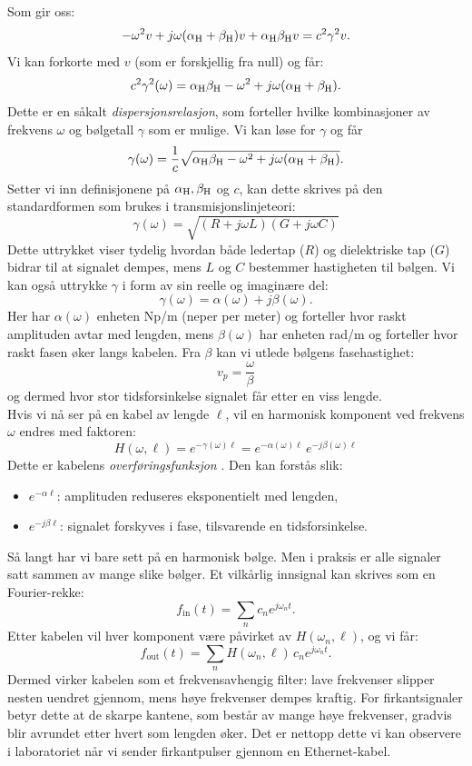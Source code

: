 Som gir oss:
\[    
-\omega^2 v + j\omega(\alpha_{\mathrm{H}}+\beta_{\mathrm{H}})v + \alpha_{\mathrm{H}} \beta_{\mathrm{H}} v = c^2 \gamma^2 v.
\]
Vi kan forkorte med $v$ (som er forskjellig fra null) og får:
\[
c^2 \gamma^2(\omega) = \alpha_{\mathrm{H}} \beta_{\mathrm{H}} - \omega^2 + j\omega(\alpha_{\mathrm{H}}+\beta_{\mathrm{H}}).
\]
\clearpage
\noindent Dette er en såkalt \emph{dispersjonsrelasjon}, som forteller hvilke kombinasjoner av 
frekvens $\omega$ og bølgetall $\gamma$ som er mulige. Vi kan løse for $\gamma$ og får
\[
\gamma(\omega) = \frac{1}{c}\sqrt{\alpha_{\mathrm{H}}\beta_{\mathrm{H}} - \omega^2 + j\omega(\alpha_{\mathrm{H}}+\beta_{\mathrm{H}})}.
\]
Setter vi inn definisjonene på $\alpha_{\mathrm{H}},\beta_{\mathrm{H}}$ og $c$, kan dette skrives på den standardformen
som brukes i transmisjonslinjeteori:
\begin{equation}
\;\gamma(\omega) = \sqrt{(R+j\omega L)(G+j\omega C)}\;
\label{eq:prop-konstant}
\end{equation}
Dette uttrykket viser tydelig hvordan både ledertap ($R$) og dielektriske tap ($G$) bidrar 
til at signalet dempes, mens $L$ og $C$ bestemmer hastigheten til bølgen. Vi kan også uttrykke $\gamma$
i form av sin reelle og imaginære del:
\[
\gamma(\omega) = \alpha(\omega) + j\beta(\omega).
\]
Her har $\alpha(\omega)$ enheten Np/m (neper per meter) og forteller hvor raskt amplituden 
avtar med lengden, mens $\beta(\omega)$ har enheten rad/m og forteller hvor raskt fasen 
øker langs kabelen. Fra $\beta$ kan vi utlede bølgens fasehastighet:
\[v_p = \frac{\omega}{\beta}\]
og dermed hvor stor tidsforsinkelse signalet får etter en viss lengde.\\[1em]
Hvis vi nå ser på en kabel av lengde $\ell$, vil en harmonisk komponent ved frekvens $\omega$ 
endres med faktoren:
\begin{equation}
H(\omega,\ell) = e^{-\gamma(\omega)\ell} = e^{-\alpha(\omega)\ell}\,e^{-j\beta(\omega)\ell}
\end{equation}
Dette er kabelens \emph{overføringsfunksjon} \cite{wikipedia_telegrapher}. 
Den kan forstås slik:
\begin{itemize}
    \item \textbf{$e^{-\alpha \ell}$}: amplituden reduseres eksponentielt med lengden, 
    \item \textbf{$e^{-j\beta \ell}$}: signalet forskyves i fase, tilsvarende en tidsforsinkelse.\\[1em]
\end{itemize}
Så langt har vi bare sett på en harmonisk bølge. Men i praksis er alle signaler satt sammen av mange slike bølger. 
Et vilkårlig innsignal kan skrives som en Fourier-rekke:
\[
f_{\text{in}}(t) = \sum_n c_n e^{j\omega_n t}.
\]
Etter kabelen vil hver komponent være påvirket av $H(\omega_n,\ell)$, og vi får:
\[
f_{\text{out}}(t) = \sum_n H(\omega_n,\ell)\,c_n e^{j\omega_n t}.
\]
Dermed virker kabelen som et frekvensavhengig filter: lave frekvenser slipper nesten uendret gjennom, 
mens høye frekvenser dempes kraftig. For firkantsignaler betyr dette at de skarpe kantene, 
som består av mange høye frekvenser, gradvis blir avrundet etter hvert som lengden øker. 
Det er nettopp dette vi kan observere i laboratoriet når vi sender firkantpulser gjennom en Ethernet-kabel.



